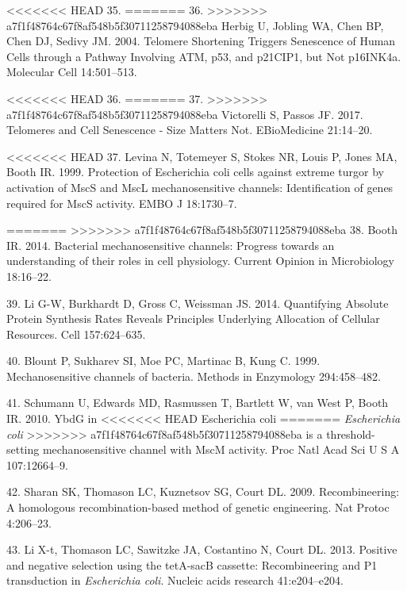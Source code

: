 \hypertarget{ref-herbig2004}{}
<<<<<<< HEAD
35.
=======
36.
>>>>>>> a7f1f48764c67f8af548b5f30711258794088eba
Herbig
U,
Jobling
WA,
Chen
BP,
Chen
DJ,
Sedivy
JM.
2004.
Telomere
Shortening
Triggers
Senescence
of
Human
Cells
through
a
Pathway
Involving
ATM,
p53,
and
p21CIP1,
but
Not
p16INK4a.
Molecular
Cell
14:501--513.

\hypertarget{ref-victorelli2017}{}
<<<<<<< HEAD
36.
=======
37.
>>>>>>> a7f1f48764c67f8af548b5f30711258794088eba
Victorelli
S,
Passos
JF.
2017.
Telomeres
and
Cell
Senescence
- Size
Matters
Not.
EBioMedicine
21:14--20.

<<<<<<< HEAD
\hypertarget{ref-levina1999}{}
37.
Levina
N,
Totemeyer
S,
Stokes
NR,
Louis
P,
Jones
MA,
Booth
IR.
1999.
Protection
of
Escherichia
coli
cells
against
extreme
turgor
by
activation
of
MscS
and
MscL
mechanosensitive
channels:
Identification
of
genes
required
for
MscS
activity.
EMBO J
18:1730--7.

=======
>>>>>>> a7f1f48764c67f8af548b5f30711258794088eba
\hypertarget{ref-booth2014}{}
38.
Booth
IR.
2014.
Bacterial
mechanosensitive
channels:
Progress
towards
an
understanding
of
their
roles
in
cell
physiology.
Current
Opinion
in
Microbiology
18:16--22.

\hypertarget{ref-li2014}{}
39. Li
G-W,
Burkhardt
D,
Gross
C,
Weissman
JS.
2014.
Quantifying
Absolute
Protein
Synthesis
Rates
Reveals
Principles
Underlying
Allocation
of
Cellular
Resources.
Cell
157:624--635.

\hypertarget{ref-blount1999}{}
40.
Blount
P,
Sukharev
SI,
Moe
PC,
Martinac
B,
Kung
C.
1999.
Mechanosensitive
channels
of
bacteria.
Methods
in
Enzymology
294:458--482.

\hypertarget{ref-schumann2010}{}
41.
Schumann
U,
Edwards
MD,
Rasmussen
T,
Bartlett
W, van
West
P,
Booth
IR.
2010.
YbdG
in
<<<<<<< HEAD
Escherichia
coli
=======
\emph{Escherichia
coli}
>>>>>>> a7f1f48764c67f8af548b5f30711258794088eba
is a
threshold-setting
mechanosensitive
channel
with
MscM
activity.
Proc
Natl
Acad
Sci U
S A
107:12664--9.

\hypertarget{ref-sharan2009}{}
42.
Sharan
SK,
Thomason
LC,
Kuznetsov
SG,
Court
DL.
2009.
Recombineering:
A
homologous
recombination-based
method
of
genetic
engineering.
Nat
Protoc
4:206--23.

\hypertarget{ref-li2013}{}
43. Li
X-t,
Thomason
LC,
Sawitzke
JA,
Costantino
N,
Court
DL.
2013.
Positive
and
negative
selection
using
the
tetA-sacB
cassette:
Recombineering
and P1
transduction
in
\emph{Escherichia
coli}.
Nucleic
acids
research
41:e204--e204.

